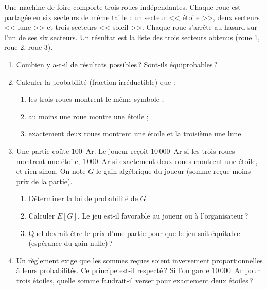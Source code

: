 \begin{exo}\label{exo:proba-20}
Une machine de foire comporte trois roues ind\'ependantes. Chaque roue est partag\'ee en six secteurs de m\^eme taille :
un secteur << \'etoile >>, deux secteurs << lune >> et trois secteurs << soleil >>.
Chaque roue s'arr\^ete au hasard sur l'un de ses six secteurs.
Un r\'esultat est la liste des trois secteurs obtenus (roue 1, roue 2, roue 3).
\begin{enumerate}
\item Combien y a-t-il de r\'esultats possibles\,? Sont-ils \'equiprobables\,?
\item Calculer la probabilit\'e (fraction irr\'eductible) que :
      \begin{enumerate}
      \item les trois roues montrent le m\^eme symbole ;
      \item au moins une roue montre une \'etoile ;
      \item exactement deux roues montrent une \'etoile et la troisi\`eme une lune.
      \end{enumerate}
\item Une partie co\^ute $100$~Ar. Le joueur re\c{c}oit $10\,000$~Ar si les trois roues montrent une \'etoile,
      $1\,000$~Ar si exactement deux roues montrent une \'etoile, et rien sinon.
      On note $G$ le gain alg\'ebrique du joueur (somme re\c{c}ue moins prix de la partie).
      \begin{enumerate}
      \item D\'eterminer la loi de probabilit\'e de $G$.
      \item Calculer $E[G]$. Le jeu est-il favorable au joueur ou \`a l'organisateur\,?
      \item Quel devrait \^etre le prix d'une partie pour que le jeu soit \'equitable (esp\'erance du gain nulle)\,?
      \end{enumerate}
\item Un r\`eglement exige que les sommes re\c{c}ues soient inversement proportionnelles \`a leurs probabilit\'es.
      Ce principe est-il respect\'e\,? Si l'on garde $10\,000$~Ar pour trois \'etoiles,
      quelle somme faudrait-il verser pour exactement deux \'etoiles\,?
\end{enumerate}
\end{exo}
%
